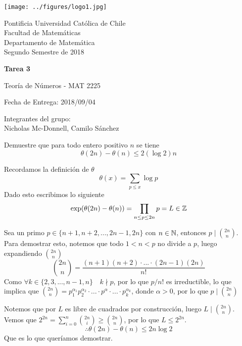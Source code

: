 


\begin{minipage}{2.5cm}
	\texttt{[image: ../figures/logo1.jpg]}
\end{minipage}
\begin{minipage}{13cm}
	\begin{flushleft}
		\raggedright
		{
			\noindent
			{\sc Pontificia Universidad Católica de Chile\\
				Facultad de Matemáticas\\
				Departamento de Matemática} \smallskip \\
			Segundo Semestre de 2018\\
		}
	\end{flushleft}
\end{minipage}

\vspace{2ex}
{\Large \centerline{\bf Tarea 3}}
{\large \centerline{Teoría de Números - MAT 2225}}
\centerline{Fecha de Entrega: 2018/09/04}

\begin{flushright}
	Integrantes del grupo:\\
	Nicholas Mc-Donnell, Camilo Sánchez
\end{flushright}

\begin{prob}[3 pts.]
	Demuestre que para todo entero positivo $n$ se tiene
	\[\theta(2n)-\theta(n)\leq 2(\log 2)n\]
\end{prob}

\begin{sol}
	Recordamos la definición de $\theta$
	\[\theta(x)=\sum_{p\leq x}\log p\]
	Dado esto escribimos lo siguiente
	\[\exp(\theta(2n)-\theta(n))=\prod_{n\leq p\leq 2n}p=L\in\mathbb{Z}\]
	\begin{lem}
		Sea un primo $p\in\{n+1,n+2,...,2n-1,2n\}$ con $n\in\mathbb{N}$, entonces $p\mid\binom{2n}{n}$.\\
		Para demostrar esto, notemos que todo $1<n<p$ no divide a $p$, luego expandiendo $\binom{2n}{n}$
		\[\binom{2n}{n}=\frac{(n+1)(n+2)\cdot...\cdot(2n-1)(2n)}{n!}\]
		Como $\forall k\in\{2,3,...,n-1,n\}\quad k\nmid p$, por lo que $p/n!$ es irreductible, lo que implica que $\binom{2n}{n}=p_1^{\alpha_1}p_2^{\alpha_2}\cdot...\cdot p^{\alpha}\cdot...\cdot p_k^{\alpha_k}$, donde $\alpha>0$, por lo que $p\mid\binom{2n}{n}$
	\end{lem}
	Notemos que por $L$ es libre de cuadrados por construcción, luego $L\mid \binom{2n}{n}$. Vemos que $2^{2n}=\sum_{i=0}^n\binom{2n}{i}\geq\binom{2n}{n}$, por lo que $L\leq 2^{2n}$.
	\[\therefore\theta(2n)-\theta(n)\leq2n\log2\]
	Que es lo que queríamos demostrar.
\end{sol}

